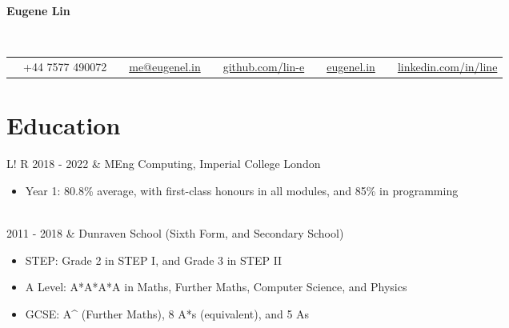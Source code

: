 \documentclass[10pt, a4paper]{article}
\newcommand\vsep{\color{lightgray} \vrule width 0.5pt}
\begin{document}
        \begin{center}
            \bfseries\huge\sc Eugene Lin
        \end{center}
        \
        \begin{tabular*}{0.99\textwidth}{@{\extracolsep{\fill}} ccccc}
            \faPhone \ \ +44 7577 490072 &
            \faEnvelope \ \ \href{mailto:me@eugenel.in}{me@eugenel.in} &
            \faGithub \ \ \href{https://github.com/lin-e/}{github.com/lin-e} &
            \faGlobe \ \ \href{https://eugenel.in/}{eugenel.in} &
            \faLinkedinSquare \ \ \href{https://www.linkedin.com/in/line/}{linkedin.com/in/line}
        \end{tabular*}
        \section*{\large\sc Education}
            \begin{tabular}{L!{\vsep}R}
                2018 - 2022 & MEng Computing, Imperial College London
                \begin{itemize}
                    \item Year 1: 80.8\% average, with first-class honours in all modules, and 85\% in programming
                    \vspace{-\baselineskip}
                \end{itemize} \\
                2011 - 2018 & Dunraven School (Sixth Form, and Secondary School)
                \begin{itemize}
                    \item STEP: Grade 2 in STEP I, and Grade 3 in STEP II
                    \item A Level: A*A*A*A in Maths, Further Maths, Computer Science, and Physics
                    \item GCSE: A\^{} (Further Maths), 8 A*s (equivalent), and 5 As
                    \vspace{-\baselineskip}
                \end{itemize}
            \end{tabular}
\end{document}
